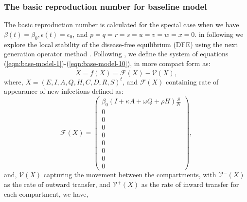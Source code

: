 \documentclass[authoryear,preprint]{elsarticle}
\begin{document}
\subsubsection{The basic reproduction number for baseline model}
The basic reproduction number is calculated for the special case when we have $\beta(t) = \beta_0, \epsilon(t) = \epsilon_0$, and $p = q = r = s = u = v = w = x = 0$. in following we explore the local stability of the disease-free equilibrium (DFE) using the next generation operator method \cite{Diekmann1990,VANDENDRIESSCHE200229}. Following \cite{VANDENDRIESSCHE200229}, we define the system of equations (\ref{eqn:base-model-1})-(\ref{eqn:base-model-10}), in more compact form as:
%
%
\begin{equation}
\dot{X} = f(X) = \mathcal{F}(X) - \mathcal{V}(X), 
\label{eqn:baseline-compact-1}
\end{equation}
%
%
where, $X = \left( E, I, A, Q, H, C, D, R, S \right)^t $, and $\mathcal{F}(X) $ containing rate of appearance of new infections defined as:
%
%
\begin{equation}
\mathcal{F}(X) = 
\begin{pmatrix}
\beta_0 \left( I + \kappa A + \omega Q + \rho H \right) \frac{S}{N} \\
0\\
0\\
0\\
0\\
0\\
0\\
0\\
0
\end{pmatrix}, 
\label{eqn:baseline-compact-2}
\end{equation}
%
%
and, $\mathcal{V}(X)$ capturing the movement between the compartments, with $\mathcal{V}^{-}(X)$ as the rate of outward transfer, and $\mathcal{V}^{+}(X)$ as the rate of inward transfer for each compartment, we have,
%
%
\end{document}
